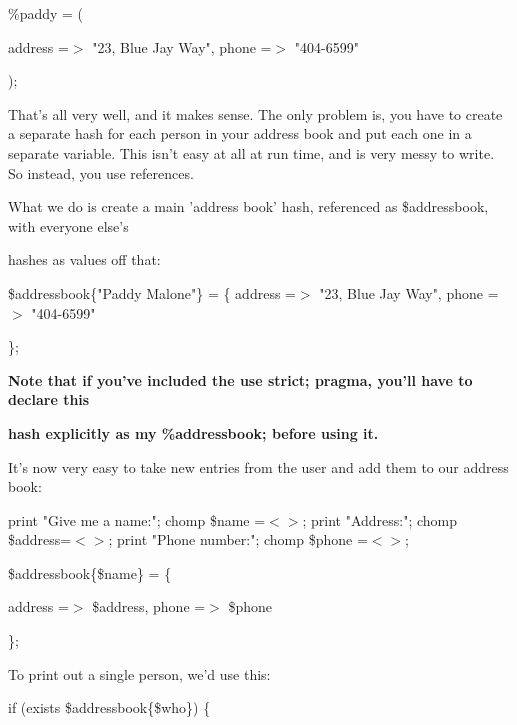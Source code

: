 \documentclass[a4paper,11pt]{book}
\begin{document}
\noindent \%paddy = (

\noindent address =$>$ "23, Blue Jay Way", phone =$>$ "404-6599"

\noindent );

\noindent 

\noindent That's all very well, and it makes sense. The only problem is, you have to create a separate hash for each person in your address book and put each one in a separate variable. This isn't easy at all at run time, and is very messy to write. So instead, you use references.

\noindent 

\noindent 

\noindent What we do is create a main 'address book' hash, referenced as \$addressbook, with everyone else's

\noindent hashes as values off that:

\noindent 

\noindent 

\noindent \$addressbook\{"Paddy Malone"\} = \{ address =$>$ "23, Blue Jay Way", phone =$>$ "404-6599"

\noindent \};

\noindent 

\noindent 

\noindent \textbf{Note that if you've included the use strict; pragma, you'll have to declare this}

\noindent \textbf{hash explicitly as my \%addressbook; before using it.}

\noindent 

\noindent 

\noindent It's now very easy to take new entries from the user and add them to our address book:

\noindent 

\noindent 

\noindent print "Give me a name:"; chomp \$name =$<$$>$; print "Address:"; chomp \$address=$<$$>$; print "Phone number:"; chomp \$phone  =$<$$>$;

\noindent \$addressbook\{\$name\} = \{

\noindent address =$>$ \$address, phone =$>$ \$phone

\noindent \};

\noindent 

\noindent To print out a single person, we'd use this:

\noindent 

\noindent if (exists \$addressbook\{\$who\}) \{
\end{document}
